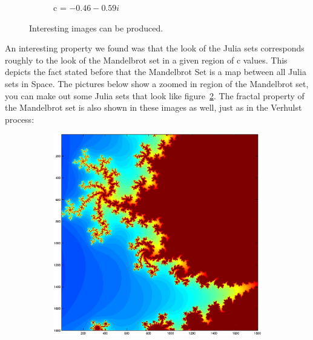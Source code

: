 \documentclass[a4wide, 10pt]{article}
\begin{document}
\begin{figure}[H]
\begin{subfigure}[b]{0.23\textwidth}
                \caption{c = $-0.46-0.59i$}
                \label{fig:c=-0.46-0.59i}
        \end{subfigure}
        \caption{Interesting images can be produced.}
\end{figure}

An interesting property we found was that the look of the Julia sets corresponds roughly to the look of
 the Mandelbrot set in a given region of c values. This depicts the fact stated before that the
  Mandelbrot Set is a map between all Julia sets in Space. The pictures below show a zoomed in region of the Mandelbrot set, you can make out some Julia sets that look like figure~\ref{fig:c=-0.46-0.59i}. The fractal property of the Mandelbrot set is also shown in these images as well, just as in the Verhulst process:  
   
\begin{figure}[H]
        \centering
        \begin{subfigure}[b]{0.24\textwidth}
                \includegraphics[width=\textwidth]{EPSFiles/MandelbrotZoom1}
                \label{fig:Zoom1}
        \end{subfigure}
        \begin{subfigure}[b]{0.24\textwidth}

\end{subfigure}
\end{figure}
\end{document}

